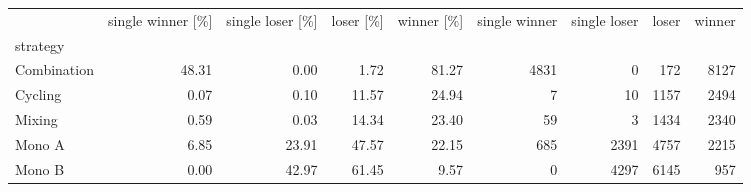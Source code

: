 \begin{tabular}{lrrrrrrrr}
\toprule
 & single winner [\%] & single loser [\%] & loser [\%] & winner [\%] & single winner & single loser & loser & winner \\
strategy &  &  &  &  &  &  &  &  \\
\midrule
Combination & 48.31 & 0.00 & 1.72 & 81.27 & 4831 & 0 & 172 & 8127 \\
Cycling & 0.07 & 0.10 & 11.57 & 24.94 & 7 & 10 & 1157 & 2494 \\
Mixing & 0.59 & 0.03 & 14.34 & 23.40 & 59 & 3 & 1434 & 2340 \\
Mono A & 6.85 & 23.91 & 47.57 & 22.15 & 685 & 2391 & 4757 & 2215 \\
Mono B & 0.00 & 42.97 & 61.45 & 9.57 & 0 & 4297 & 6145 & 957 \\
\bottomrule
\end{tabular}
